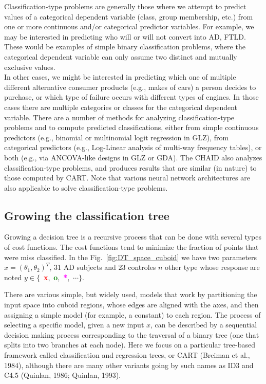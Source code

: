 \documentclass[final, paper=letter,5p,times,twocolumn]{elsarticle}
\begin{document}
Classification-type problems are generally those where we attempt to predict values of a categorical dependent variable (class, group membership, etc.) from one or more continuous and/or categorical predictor variables. For example, we may be interested in predicting who will or will not convert into AD, FTLD. These would be examples of simple binary classification problems, where the categorical dependent variable can only assume two distinct and mutually exclusive values. \\
In other cases, we might be interested in predicting which one of multiple different alternative consumer products (e.g., makes of cars) a person decides to purchase, or which type of failure occurs with different types of engines. In those cases there are multiple categories or classes for the categorical dependent variable. There are a number of methods for analyzing classification-type problems and to compute predicted classifications, either from simple continuous predictors (e.g., binomial or multinomial logit regression in GLZ), from categorical predictors (e.g., Log-Linear analysis of multi-way frequency tables), or both (e.g., via ANCOVA-like designs in GLZ or GDA). The CHAID also analyzes classification-type problems, and produces results that are similar (in nature) to those computed by CART. Note that various neural network architectures are also applicable to solve classification-type problems.




\subsection{Growing the classification tree}

Growing a decision tree is a recursive process that can be done with several types of cost functions. The cost functions tend to minimize the fraction of points that were miss classified. In the Fig.~\ref{fig:DT_space_cuboid} we have two parameters $x = (\theta_{1}, \theta_{2})^{T}$, 31 AD subjects and 23 controles $n$ other type whose response are noted $y \in \{$~{\bf\textcolor{red}{x}},~{\bf\textcolor{green}{o}},~{\bf\textcolor{magenta}{*}},~$\cdots\}$.

There are various simple, but widely used, models that work by partitioning the input space into cuboid regions, whose edges are aligned with the axes, and then assigning a simple model (for example, a constant) to each region.  The process of selecting a specific model, given a new input $x$, can be described by a sequential decision making process corresponding to the traversal of a binary tree (one that splits into two branches at each node). Here we focus on a particular tree-based framework called classification and regression trees, or CART (Breiman et al., 1984), although there are many other variants going by such names as ID3 and C4.5 (Quinlan, 1986; Quinlan, 1993). \\
\end{document}
